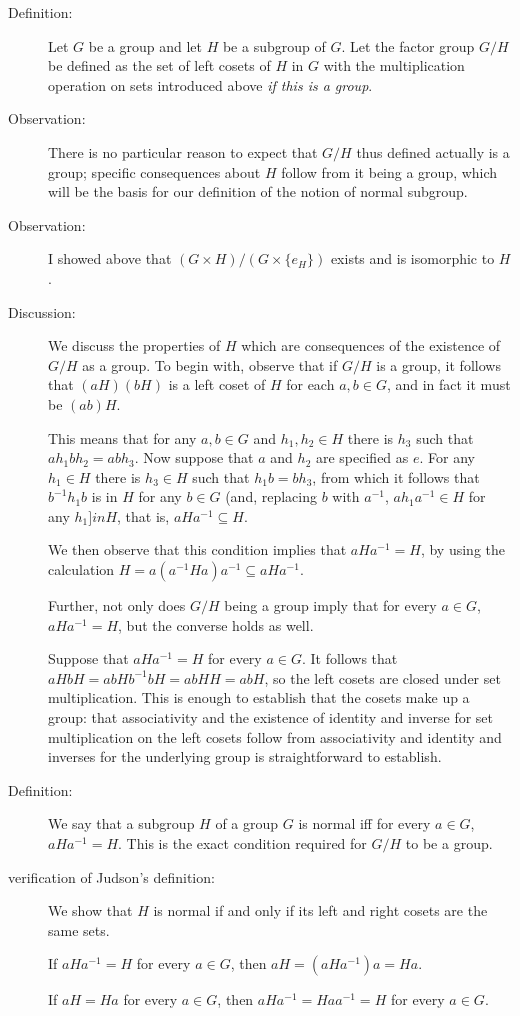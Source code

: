 \documentclass[12pt]{article}
\begin{document}
\begin{description}
\item[Definition:]  Let $G$ be a group and let $H$ be a subgroup of $G$.  Let the factor group $G/H$ be defined
as the set of left cosets of $H$ in $G$ with the multiplication operation on sets introduced above {\em if this is a group\/}.

\item[Observation:]  There is no particular reason to expect that $G/H$ thus defined actually is a group;  specific consequences about $H$ follow from it being a group, which will be the basis for our definition of the notion of normal subgroup.

\item[Observation:]  I showed above that $(G \times H)/(G \times \{e_H\})$ exists and is isomorphic to $H$.

\item[Discussion:]  We discuss the properties of $H$ which are consequences of the existence of $G/H$ as a group.
To begin with, observe that if $G/H$ is a group, it follows that $(aH)(bH)$ is a left coset of $H$ for each $a,b \in G$, and in fact it must be $(ab)H$.

This means that for any $a,b \in G$ and $h_1, h_2 \in H$ there is $h_3$ such that $ah_1bh_2 = abh_3$.  Now suppose that $a$ and $h_2$ are specified as $e$.  For any $h_1 \in H$ there is $h_3 \in H$ such that
$h_1b = bh_3$, from which it follows that $b^{-1}h_1b$ is in $H$ for any $b \in G$ (and, replacing $b$ with $a^{-1}$, $ah_1a^{-1} \in H$ for any $h_1 ]in H$, that is, $aHa^{-1} \subseteq H$.

We then observe that this condition implies that $aHa^{-1} = H$, by using the calculation $H = a(a^{-1}Ha)a^{-1} \subseteq aHa^{-1}$.

Further, not only does $G/H$ being a group imply that for every $a \in G$, $aHa^{-1} = H$, but the converse holds as well.

Suppose that $aHa^{-1} = H$ for every $a \in G$.  It follows that $aHbH = abHb^{-1}bH = abHH = abH$, so
the left cosets are closed under set multiplication.   This is enough to establish that the cosets make up a group:  that associativity and the existence of identity and inverse for set multiplication on the left cosets follow from associativity and identity and inverses for the underlying group is straightforward to establish.

\item[Definition:]  We say that a subgroup $H$ of a group $G$ is normal iff for every $a \in G$, $aHa^{-1} = H$.
This is the exact condition required for $G/H$ to be a group.

\item[verification of Judson's definition:]  We show that $H$ is normal if and only if its left and right cosets are the same sets.

If $aHa^{-1}=H$ for every $a \in G$, then $aH = (aHa^{-1})a = Ha$.

If $aH = Ha$ for every $a\in G$, then $aHa^{-1} = Haa^{-1} = H$ for every $a \in G$.


\end{description}
\end{document}
